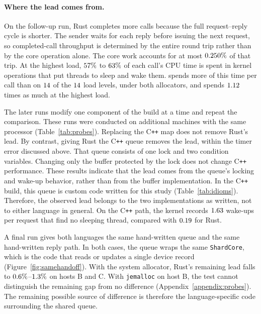 \documentclass[english,oneside,a4paper,censored,csm,software-track-2020]{HYthesisML}
\begin{document}
\paragraph{Where the lead comes from.}
On the follow-up run, Rust completes more calls because the 
full request--reply cycle is shorter. The sender waits for 
each reply before issuing the next request, so completed-call 
throughput is determined by the entire round trip rather than 
by the core operation alone. The core work accounts for at most $0.250\%$ of that trip. At the highest load, $57\%$ to $63\%$ of each call's CPU time is spent in kernel operations that put threads to sleep and wake them. \ProbeAfterSysHigher{} spends more of this time per call than \ProbeAfterSysLower{} on $14$ of the $14$ load levels, under both allocators, and spends $1.12$ times as much at the highest load.

The later runs modify one component of the build at a time and repeat 
the comparison. These runs were conducted on additional machines with 
the same processor (Table~\ref{tab:probes}). Replacing the C\texttt{++} 
map does not remove Rust's lead. By contrast, giving Rust the C\texttt{++} 
queue removes the lead, within the timer error discussed above. That queue 
consists of one lock and two condition variables. Changing only the buffer 
protected by the lock does not change C\texttt{++} performance. These results 
indicate that the lead comes from the queue's locking and wake-up behavior, 
rather than from the buffer implementation. In the C\texttt{++} build, 
this queue is custom code written for this study (Table~\ref{tab:idioms}). 
Therefore, the observed lead belongs to the two implementations as written, 
not to either language in general. On the C\texttt{++} path, the kernel records 
$1.63$ wake-ups per request that find no sleeping thread, compared with $0.19$ for Rust.

A final run gives both languages the same hand-written queue and the same 
hand-written reply path. In both cases, the queue wraps the same \texttt{ShardCore}, 
which is the code that reads or updates a single device record (Figure~\ref{fig:samehandoff}). 
With the system allocator, Rust's remaining lead falls to $0.6\%$--$1.3\%$ on hosts B and C. With \texttt{jemalloc} on host B, the test cannot distinguish the remaining gap from no difference (Appendix~\ref{appendix:probes}). The remaining possible source of difference is therefore the language-specific code surrounding the shared queue.
\end{document}
